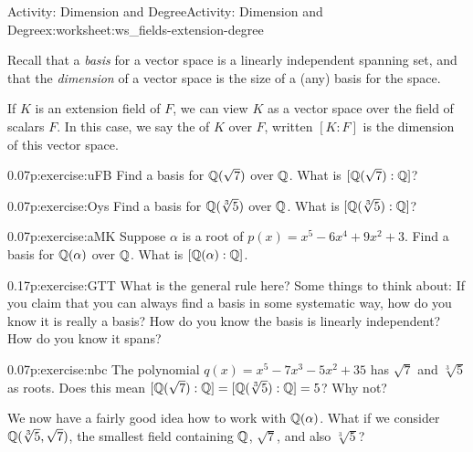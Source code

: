 \documentclass[11pt]{book}
\begin{document}
%
%
\typeout{************************************************}
\typeout{************************************************}
%
\begin{worksheet-subsection}{Activity: Dimension and Degree}{}{Activity: Dimension and Degree}{}{}{x:worksheet:ws_fields-extension-degree}
\begin{introduction}{}%
Recall that a \emph{basis} for a vector space is a linearly independent spanning set, and that the \emph{dimension} of a vector space is the size of a (any) basis for the space.%
\par
If \(K\) is an extension field of \(F\), we can view \(K\) as a vector space over the field of scalars \(F\).  In this case, we say the  of \(K\) over \(F\), written \([K:F]\) is the dimension of this vector space.%
\end{introduction}%
\begin{divisionexercise}{1}{}{0.07}{p:exercise:uFB}%
Find a basis for \(\mathbb{Q}(\sqrt{7})\) over \(\mathbb{Q}\).  What is \([\mathbb{Q}(\sqrt{7}):\mathbb{Q}]\)?%
\end{divisionexercise}%
\begin{divisionexercise}{2}{}{0.07}{p:exercise:Oys}%
Find a basis for \(\mathbb{Q}(\sqrt[3]{5})\) over \(\mathbb{Q}\).  What is \([\mathbb{Q}(\sqrt[3]{5}):\mathbb{Q}]\)?%
\end{divisionexercise}%
\begin{divisionexercise}{3}{}{0.07}{p:exercise:aMK}%
Suppose \(\alpha\) is a root of \(p(x) = x^5 -6x^4 + 9x^2 + 3\).  Find a basis for \(\mathbb{Q}(\alpha)\) over \(\mathbb{Q}\).  What is \([\mathbb{Q}(\alpha):\mathbb{Q}]\).%
\end{divisionexercise}%
\begin{divisionexercise}{4}{}{0.17}{p:exercise:GTT}%
What is the general rule here?  Some things to think about: If you claim that you can always find a basis in some systematic way, how do you know it is really a basis?  How do you know the basis is linearly independent?  How do you know it spans?%
\end{divisionexercise}%
\begin{divisionexercise}{5}{}{0.07}{p:exercise:nbc}%
The polynomial \(q(x) = x^5 -7x^3 - 5x^2 + 35\) has \(\sqrt{7}\) and \(\sqrt[3]{5}\) as roots.  Does this mean \([\mathbb{Q}(\sqrt{7}):\mathbb{Q}] = [\mathbb{Q}(\sqrt[3]{5}):\mathbb{Q}] = 5\)?  Why not?%
\end{divisionexercise}%
\clearpage
We now have a fairly good idea how to work with \(\mathbb{Q}(\alpha)\).  What if we consider \(\mathbb{Q}(\sqrt[3]{5}, \sqrt{7})\), the smallest field containing \(\mathbb{Q}\), \(\sqrt{7}\), and also \(\sqrt[3]{5}\)?%

\end{worksheet-subsection}
\end{document}
